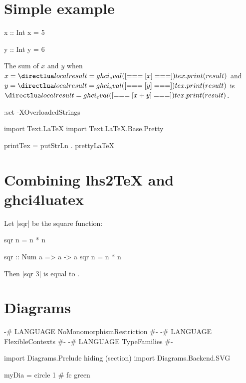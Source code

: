 \documentclass{article}
\begin{document}
\section{Simple example}

\begin{ghci}
x :: Int
x = 5

y :: Int
y = 6
\end{ghci}

The sum of $x$ and $y$ when $x = \hask{x}$ and $y = \hask{y}$ is $\hask{x + y}$.


\begin{ghci}
:set -XOverloadedStrings
\end{ghci}

\begin{ghci}
import Text.LaTeX
import Text.LaTeX.Base.Pretty

printTex = putStrLn . prettyLaTeX
\end{ghci}




\section{Combining lhs2TeX and ghci4luatex}


Let |sqr| be the square function:

\begin{code}
sqr n = n * n
\end{code}

\begin{ghci}
  sqr :: Num a => a -> a
  sqr n = n * n
\end{ghci}

Then  |sqr 3| is equal to .


\section{Diagrams}

\begin{ghci}
{-# LANGUAGE NoMonomorphismRestriction #-}
{-# LANGUAGE FlexibleContexts          #-}
{-# LANGUAGE TypeFamilies              #-}

import Diagrams.Prelude hiding (section)
import Diagrams.Backend.SVG

myDia = circle 1 # fc green
\end{ghci}
\end{document}
